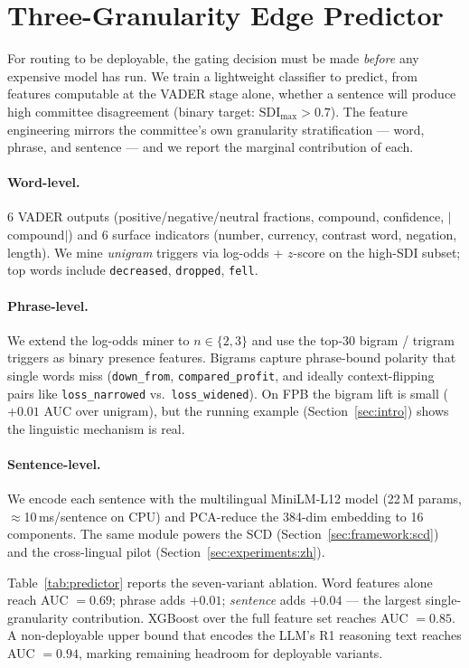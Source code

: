 \section{Three-Granularity Edge Predictor}
\label{sec:predictor}

For routing to be deployable, the gating decision must be made
\emph{before} any expensive model has run. We train a lightweight
classifier to predict, from features computable at the VADER stage
alone, whether a sentence will produce high committee disagreement
(binary target: $\mathrm{SDI}_{\max}>0.7$). The feature engineering
mirrors the committee's own granularity stratification ---
word, phrase, and sentence --- and we report the marginal
contribution of each.

\paragraph{Word-level.}
6 VADER outputs (positive/negative/neutral fractions, compound,
confidence, $|$compound$|$) and 6 surface indicators (number,
currency, contrast word, negation, length). We mine \emph{unigram}
triggers via log-odds + $z$-score on the high-SDI subset; top words
include \texttt{decreased}, \texttt{dropped}, \texttt{fell}.

\paragraph{Phrase-level.}
We extend the log-odds miner to $n\!\in\!\{2,3\}$ and use the
top-30 bigram / trigram triggers as binary presence features.
Bigrams capture phrase-bound polarity that single words miss
(\texttt{down\_from}, \texttt{compared\_profit}, and ideally
context-flipping pairs like \texttt{loss\_narrowed} vs.\
\texttt{loss\_widened}). On FPB the bigram lift is small ($+0.01$
AUC over unigram), but the running example
(Section~\ref{sec:intro}) shows the linguistic mechanism is real.

\paragraph{Sentence-level.}
We encode each sentence with the multilingual MiniLM-L12 model
(22\,M params, $\approx$10\,ms/sentence on CPU) and PCA-reduce the
384-dim embedding to 16 components. The same module powers the SCD
(Section~\ref{sec:framework:scd}) and the cross-lingual pilot
(Section~\ref{sec:experiments:zh}).

Table~\ref{tab:predictor} reports the seven-variant ablation. Word
features alone reach AUC $=0.69$; phrase adds $+0.01$;
\emph{sentence} adds $+0.04$ --- the largest single-granularity
contribution. XGBoost over the full feature set reaches AUC $=0.85$.
A non-deployable upper bound that encodes the LLM's R1 reasoning
text reaches AUC $=0.94$, marking remaining headroom for deployable
variants.

